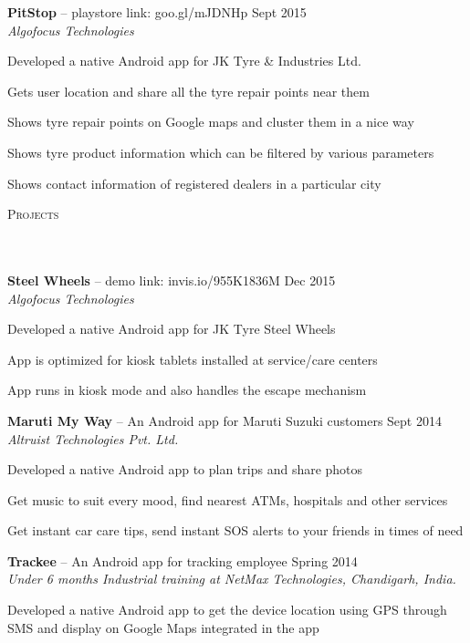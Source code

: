 \documentclass{article}
\newcommand{\header}[1]{{
\hspace*{-15pt}\vspace*{6pt} \textsc{#1}} \vspace*{-6pt} 
\lineunder
}
\newcommand{\lineunder}{
\vspace*{-8pt} \\ \hspace*{-18pt} 
\hrulefill \\
}
\newcommand{\project}[4]{{
\vspace*{2pt}%
\textbf{#1} #2 \hfill #3\\ \textit{#4} \vspace*{2pt}}
}
\renewcommand{\labelitemii}{
$\vcenter{\hbox{\tiny$\bullet$}}$\hspace*{-3pt}
}
\newenvironment{bullet-list-minor}{
\begin{list}{\labelitemii}{\setlength\leftmargin{15pt} 
\topsep 0pt \itemsep -2pt}}{\vspace*{4pt}\end{list}
}
\begin{document}
    \project{PitStop}{-- playstore link: goo.gl/mJDNHp}{Sept 2015}{Algofocus Technologies}
	\begin{bullet-list-minor}
	\item Developed a native Android app for JK Tyre \& Industries Ltd.
	\item Gets user location and share all the tyre repair points near them
	\item Shows tyre repair points on Google maps and cluster them in a nice way
	\item Shows tyre product information which can be filtered by various parameters 
	\item Shows contact information of registered dealers in a particular city 
	\end{bullet-list-minor}

\newpage
\vspace*{-20pt}
\header{Projects}
    \project{Steel Wheels}{-- demo link: invis.io/955K1836M}{Dec 2015}{Algofocus Technologies}
	\begin{bullet-list-minor}
    \item Developed a native Android app for JK Tyre Steel Wheels
    \item App is optimized for kiosk tablets installed at service/care centers
	\item App runs in kiosk mode and also handles the escape mechanism 
	\end{bullet-list-minor}
	
    \project{Maruti My Way}{-- An Android app for Maruti Suzuki customers}{Sept 2014}{Altruist Technologies Pvt. Ltd.}
	\begin{bullet-list-minor}
	\item Developed a native Android app to plan trips and share photos
	\item Get music to suit every mood, find nearest ATMs, hospitals and other services
	\item Get instant car care tips, send instant SOS alerts to your friends in times of need 
    \end{bullet-list-minor}

    \project{Trackee}{-- An Android app for tracking employee}{Spring 2014}{Under 6 months Industrial training at NetMax Technologies, Chandigarh, India.}
	\begin{bullet-list-minor}
	\item Developed a native Android app to get the device location using GPS through SMS and display on Google Maps integrated in the app
	\end{bullet-list-minor}
\end{document}
